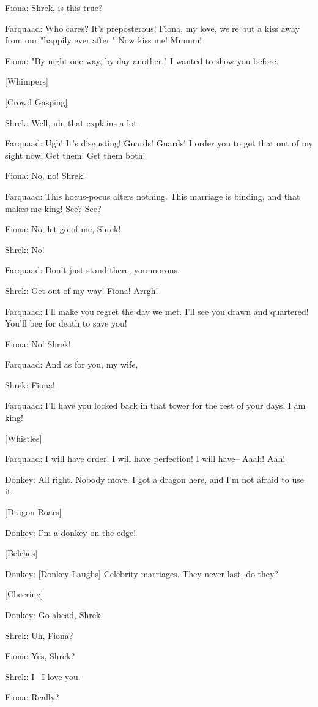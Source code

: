 \documentclass{article}
\begin{document}
Fiona:
Shrek, is this true?

Farquaad:
Who cares? It's preposterous! Fiona, my love, we're but a kiss away from our "happily ever after." Now kiss me! Mmmm!

Fiona:
"By night one way, by day another." I wanted to show you before.

[Whimpers]

[Crowd Gasping]

Shrek:
Well, uh, that explains a lot.

Farquaad:
Ugh! It's disgusting! Guards! Guards! I order you to get that out of my sight now! Get them! Get them both!

Fiona:
No, no! Shrek!

Farquaad:
This hocus-pocus alters nothing. This marriage is binding, and that makes me king! See? See?

Fiona:
No, let go of me, Shrek!

Shrek:
No!

Farquaad:
Don't just stand there, you morons.

Shrek:
Get out of my way! Fiona! Arrgh!

Farquaad:
I'll make you regret the day we met. I'll see you drawn and quartered! You'll beg for death to save you!

Fiona:
No! Shrek!

Farquaad:
And as for you, my wife,

Shrek:
Fiona!

Farquaad:
I'll have you locked back in that tower for the rest of your days! I am king!

[Whistles]

Farquaad:
I will have order! I will have perfection! I will have-- Aaah! Aah!

Donkey:
All right. Nobody move. I got a dragon here, and I'm not afraid to use it.

[Dragon Roars]

Donkey:
I'm a donkey on the edge!

[Belches]

Donkey:
[Donkey Laughs] Celebrity marriages. They never last, do they?

[Cheering]

Donkey:
Go ahead, Shrek.

Shrek:
Uh, Fiona?

Fiona:
Yes, Shrek?

Shrek:
I-- I love you.

Fiona:
Really?
\end{document}
